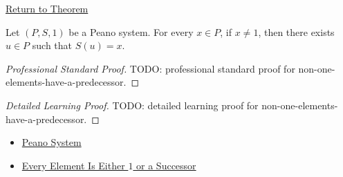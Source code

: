 \newpage
{}
\label{prf:non-one-elements-have-a-predecessor}

\begin{remark*}[Return]
\hyperref[cor:non-one-elements-have-a-predecessor]{Return to Theorem}
\end{remark*}

\begin{corollary*}
Let $(P,S,1)$ be a Peano system. For every $x \in P$, if $x \neq 1$, then
there exists $u \in P$ such that $S(u)=x$.
\end{corollary*}

\begin{proof}[Professional Standard Proof]
\LRAProofBodyStart
TODO: professional standard proof for non-one-elements-have-a-predecessor.
\end{proof}

\begin{proof}[Detailed Learning Proof]
\LRAProofBodyStart
TODO: detailed learning proof for non-one-elements-have-a-predecessor.
\end{proof}

\begin{remark*}
\end{remark*}

\begin{dependencies}
\begin{itemize}
  \item \hyperref[def:peano-system]{Peano System}
  \item \hyperref[thm:every-element-is-one-or-a-successor]{Every Element Is Either $1$ or a Successor}
\end{itemize}
\end{dependencies}

\clearpage
